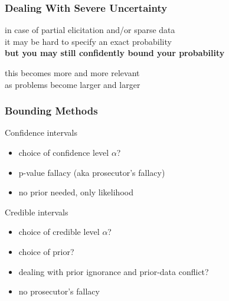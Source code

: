 \documentclass{beamer}
\newcommand{\gplus}{\structure{\textbf{+}}}
\newcommand{\gmins}{\structure{\textbf{--}}}
\begin{document}
\begin{frame}
  \frametitle{Dealing With Severe Uncertainty}
  \begin{alertblock}{}
    in case of \alert{partial elicitation} and/or \alert{sparse data}
    \\
    it may be hard to specify an exact probability
    \\
    \textbf{but you may still confidently bound your probability}
  \end{alertblock}
  \vspace{2em}
  this becomes more and more relevant \\
  as problems become larger and larger
\end{frame}

\begin{frame}
  \frametitle{Bounding Methods} %
  \begin{block}{Confidence intervals} %
    \begin{itemize}
  \setlength{\itemsep}{0pt}
  \setlength{\parskip}{0pt}
  \setlength{\parsep}{0pt}
    \item[\gmins] choice of confidence level $\alpha$?
    \item[\gmins] p-value fallacy (aka prosecutor's fallacy)
    \item[\gplus] no prior needed, only likelihood
    \end{itemize}
  \end{block}
  \begin{block}{Credible intervals}
      \begin{itemize}
  \setlength{\itemsep}{0pt}
  \setlength{\parskip}{0pt}
  \setlength{\parsep}{0pt}
      \item[\gmins] choice of credible level $\alpha$?
      \item[\gmins] choice of prior?
      \item[\gmins] dealing with prior ignorance and prior-data conflict?
      \item[\gplus] no prosecutor's fallacy
      \end{itemize}
  \end{block}
  \begin{columns}
  \begin{column}{0.8\textwidth}

\end{column}
\end{columns}
\end{frame}
\end{document}
